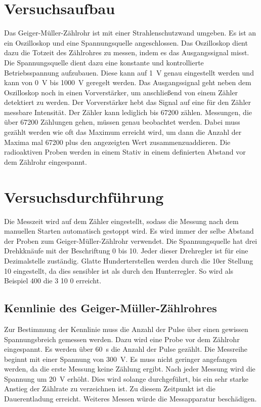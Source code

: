 %

%
\section{Versuchsaufbau}
Das Geiger-Müller-Zählrohr ist mit einer Strahlenschutzwand umgeben. Es ist an ein Oszilloskop und eine Spannungsquelle angeschlossen.
Das Oszilloskop dient dazu die Totzeit des Zählrohres zu messen, indem es das Ausgangssignal misst. Die Spannungsquelle dient dazu eine 
konstante und kontrollierte Betriebsspannung aufzubauen. Diese kann auf \qty{1}{\volt} genau eingestellt werden und kann von 
\qty{0}{\volt} bis \qty{1000}{\volt} geregelt werden. Das Ausgangssignal geht neben dem Oszilloskop noch in einen Vorverstärker, um 
anschließend von einem Zähler detektiert zu werden. Der Vorverstärker hebt das Signal auf eine für den Zähler messbare Intensität. Der 
Zähler kann lediglich bis 67200 zählen. Messungen, die über 67200 Zählungen gehen, müssen genau beobachtet werden. Dabei muss gezählt 
werden wie oft das Maximum erreicht wird, um dann die Anzahl der Maxima mal 67200 plus den angezeigten Wert zusammenzuaddieren. Die 
radioaktiven Proben werden in einem Stativ in einem definierten Abstand vor dem Zählrohr eingespannt.  


\section{Versuchsdurchführung}
Die Messzeit wird auf dem Zähler eingestellt, sodass die Messung nach dem manuellen Starten automatisch gestoppt wird. Es wird immer 
der selbe Abstand der Proben zum Geiger-Müller-Zählrohr verwendet. Die Spannungsquelle hat drei Drehkknäufe mit der Beschriftung 0 bis 
10. Jeder dieser Drehregler ist für eine Dezimalstelle zuständig. Glatte Hunderterstellen werden durch die 10er Stellung 10 eingestellt, 
da dies sensibler ist als durch den Hunterregler. So wird als Beispiel 400 die 3 10 0 erreicht.
\subsection{Kennlinie des Geiger-Müller-Zählrohres}
\noindent Zur Bestimmung der Kennlinie muss die Anzahl der Pulse über einen gewissen Spannungsbreich gemessen werden. Dazu wird eine Probe 
vor dem Zählrohr eingespannt. Es werden über \qty{60}{\second} die Anzahl der Pulse gezählt. Die Messreihe beginnt mit einer Spannung 
von \qty{300}{\volt}. Es muss nicht geringer angefangen werden, da die erste Messung keine Zählung ergibt. Nach jeder Messung wird 
die Spannung um \qty{20}{\volt} erhöht. Dies wird solange durchgeführt, bis ein sehr starke Anstieg der Zählrate zu verzeichnen ist. 
Zu diesem Zeitpunkt ist die Dauerentladung erreicht. Weiteres Messen würde die Messapparatur beschädigen. 

